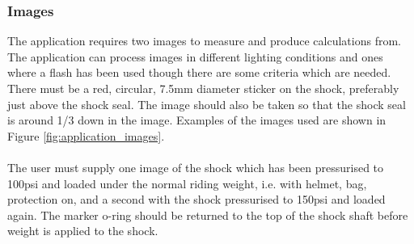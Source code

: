 		\subsubsection{Images}
			The application requires two images to measure and produce calculations from. The application can process images in different lighting conditions and ones where a flash has been used though there are some criteria which are needed. There must be a red, circular, 7.5mm diameter sticker on the shock, preferably just above the shock seal. The image should also be taken so that the shock seal is around 1/3 down in the image. Examples of the images used are shown in Figure \ref{fig:application_images}.
			\\\\
			The user must supply one image of the shock which has been pressurised to 100psi and loaded under the normal riding weight, i.e. with helmet, bag, protection on, and a second with the shock pressurised to 150psi and loaded again. The marker o-ring should be returned to the top of the shock shaft before weight is applied to the shock.
